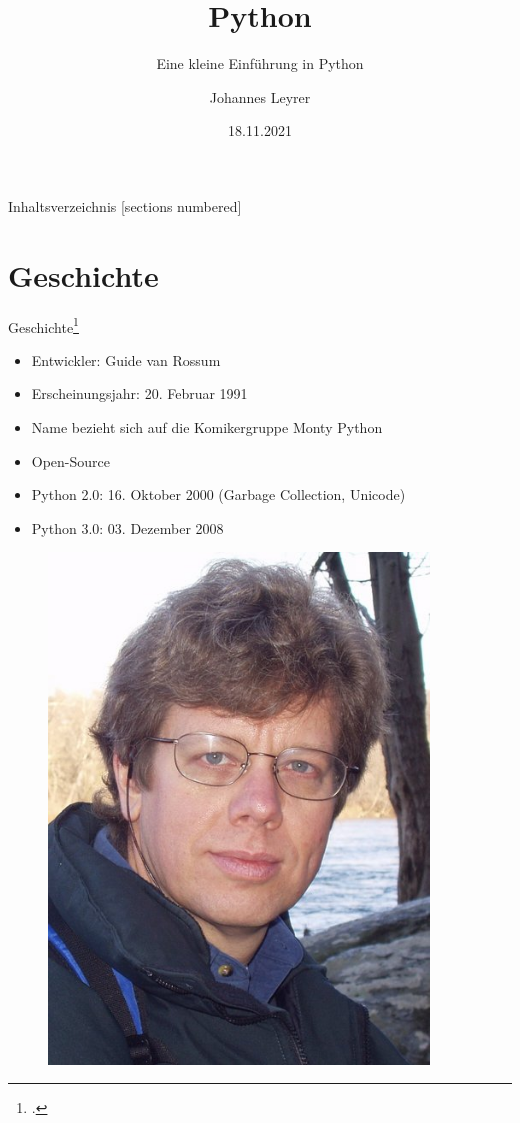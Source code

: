\documentclass[10pt,ngerman]{beamer}
\title{Python}
\date{18.11.2021}
\author{Johannes Leyrer}
\institute{BSZ für Elektrotechnik Dresden -- IT20/2}
\subtitle{Eine kleine Einführung in Python}
\begin{document}
\maketitle

\begin{frame}{Inhaltsverzeichnis}
  [sections numbered]
  \tableofcontents[hideallsubsections]
\end{frame}

\section{Geschichte}

\begin{frame}[fragile]{Geschichte\footcite{wiki:python}}

  \begin{minipage}[t]{0.69\textwidth}
    \begin{itemize}
      \item Entwickler: Guide van Rossum
      \item Erscheinungsjahr: 20. Februar 1991
      \item Name bezieht sich auf die Komikergruppe Monty Python
      \item Open-Source
      \item Python 2.0: 16. Oktober 2000 (Garbage Collection, Unicode)
      \item Python 3.0: 03. Dezember 2008
    \end{itemize}
  \end{minipage}
  \begin{minipage}[t]{0.29\textwidth}
    \begin{figure}
      \centering
      \includegraphics[width=0.9\textwidth]{pictures/Guido_van_Rossum.jpg}

\end{figure}
\end{minipage}
\end{frame}
\end{document}
